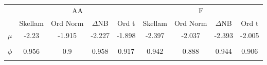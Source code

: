 \begin{footnotesize}
\tabcolsep=0.07cm
\begin{singlespace}
\begin{tabular}{ccccccccc} \toprule 
 & \multicolumn{4}{c}{AA}& \multicolumn{4}{c}{F} \\ 
\cmidrule(r){2-5} \cmidrule(r){6-9} &  \multicolumn{1}{c}{Skellam}&  \multicolumn{1}{c}{Ord Norm}&  \multicolumn{1}{c}{$\Delta$NB}&  \multicolumn{1}{c}{Ord t}&  \multicolumn{1}{c}{Skellam}&  \multicolumn{1}{c}{Ord Norm}&  \multicolumn{1}{c}{$\Delta$NB}&  \multicolumn{1}{c}{Ord t} \\ \midrule 
 $ \mu $ & -2.23 & -1.915 & -2.227 & -1.898 & -2.397 & -2.037 & -2.393 & -2.005 \\ 
 & \begin{tiny} [-2.29,-2.17] \end{tiny}  & \begin{tiny} [-1.96,-1.869] \end{tiny}  & \begin{tiny} [-2.288,-2.167] \end{tiny}  & \begin{tiny} [-1.943,-1.854] \end{tiny}  & \begin{tiny} [-2.442,-2.351] \end{tiny}  & \begin{tiny} [-2.07,-2.005] \end{tiny}  & \begin{tiny} [-2.436,-2.348] \end{tiny}  & \begin{tiny} [-2.036,-1.973] \end{tiny}  \\ 
$ \phi $ & 0.956 & 0.9 & 0.958 & 0.917 & 0.942 & 0.888 & 0.944 & 0.906 \\ 
 & \begin{tiny} [0.944,0.968] \end{tiny}  & \begin{tiny} [0.881,0.921] \end{tiny}  & \begin{tiny} [0.947,0.971] \end{tiny}  & \begin{tiny} [0.898,0.933] \end{tiny}  & \begin{tiny} [0.933,0.951] \end{tiny}  & \begin{tiny} [0.876,0.901] \end{tiny}  & \begin{tiny} [0.936,0.953] \end{tiny}  & \begin{tiny} [0.894,0.918] \end{tiny}  \\ 

\end{tabular}
\end{singlespace}
\end{footnotesize}
